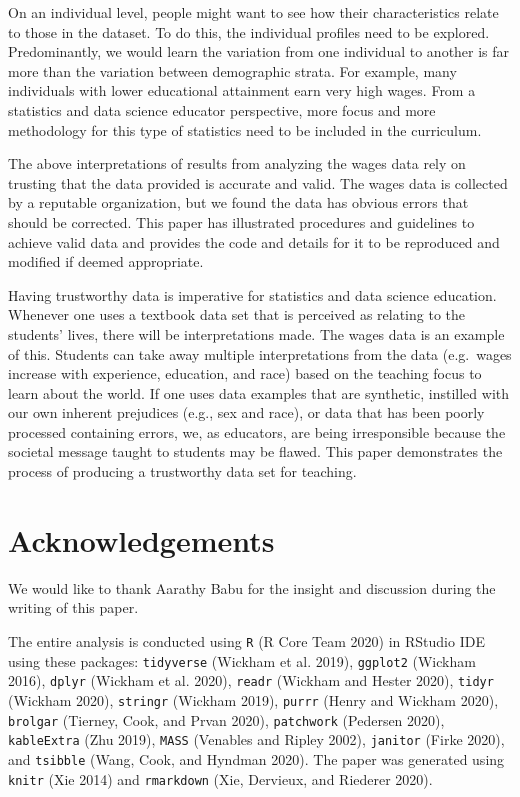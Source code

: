 \documentclass{article}
\begin{document}
On an individual level, people might want to see how their characteristics relate to those in the dataset. To do this, the individual profiles need to be explored. Predominantly, we would learn the variation from one individual to another is far more than the variation between demographic strata. For example, many individuals with lower educational attainment earn very high wages. From a statistics and data science educator perspective, more focus and more methodology for this type of statistics need to be included in the curriculum.

The above interpretations of results from analyzing the wages data rely on trusting that the data provided is accurate and valid. The wages data is collected by a reputable organization, but we found the data has obvious errors that should be corrected. This paper has illustrated procedures and guidelines to achieve valid data and provides the code and details for it to be reproduced and modified if deemed appropriate.

Having trustworthy data is imperative for statistics and data science education. Whenever one uses a textbook data set that is perceived as relating to the students' lives, there will be interpretations made. The wages data is an example of this. Students can take away multiple interpretations from the data (e.g.~wages increase with experience, education, and race) based on the teaching focus to learn about the world. If one uses data examples that are synthetic, instilled with our own inherent prejudices (e.g., sex and race), or data that has been poorly processed containing errors, we, as educators, are being irresponsible because the societal message taught to students may be flawed. This paper demonstrates the process of producing a trustworthy data set for teaching.

\hypertarget{acknowledgements}{%
\section{Acknowledgements}\label{acknowledgements}}

We would like to thank Aarathy Babu for the insight and discussion during the writing of this paper.

The entire analysis is conducted using \texttt{R} (R Core Team 2020) in RStudio IDE using these packages: \texttt{tidyverse} (Wickham et al. 2019), \texttt{ggplot2} (Wickham 2016), \texttt{dplyr} (Wickham et al. 2020), \texttt{readr} (Wickham and Hester 2020), \texttt{tidyr} (Wickham 2020), \texttt{stringr} (Wickham 2019), \texttt{purrr} (Henry and Wickham 2020), \texttt{brolgar} (Tierney, Cook, and Prvan 2020), \texttt{patchwork} (Pedersen 2020), \texttt{kableExtra} (Zhu 2019), \texttt{MASS} (Venables and Ripley 2002), \texttt{janitor} (Firke 2020), and \texttt{tsibble} (Wang, Cook, and Hyndman 2020). The paper was generated using \texttt{knitr} (Xie 2014) and \texttt{rmarkdown} (Xie, Dervieux, and Riederer 2020).
\end{document}
